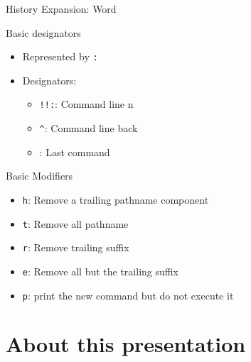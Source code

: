 \documentclass[10pt, compress, aspectratio=169]{beamer}
\begin{document}
\begin{frame}{History Expansion: Word}
  \begin{exampleblock}{Basic designators}
    \begin{itemize}
			\item Represented by \texttt{:}
			\item Designators:
			\begin{itemize}
				\item \texttt{!!:\textdollar{}}: Command line n
				\item \texttt{\^}: Command line back
				\item \texttt{\textdollar{}}: Last command
			\end{itemize}
    \end{itemize}
  \end{exampleblock}

  \begin{exampleblock}{Basic Modifiers}
    \begin{itemize}
			\item \texttt{h}: Remove a trailing pathname component
			\item \texttt{t}: Remove all pathname
			\item \texttt{r}: Remove trailing suffix
			\item \texttt{e}: Remove all but the trailing suffix
			\item \texttt{p}: print the new command but do not execute it
    \end{itemize}
  \end{exampleblock}

\end{frame}

\section{About this presentation}
\begin{frame}[standout]
   \begin{center}\ccbysa\end{center}
\end{frame}

\maketitle
\end{document}
